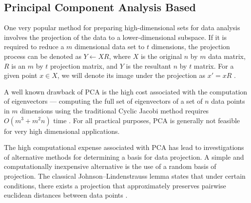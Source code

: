 \subsection{Principal Component Analysis Based}
\label{anomalyDetection:pca}
One very popular method for preparing high-dimensional sets for data analysis
involves the projection of the data to a lower-dimensional subspace. If it is
required to reduce a $m$ dimensional data set to $t$ dimensions, the projection
process can be denoted as $Y \leftarrow XR$, where $X$ is the original $n$ by
$m$ data matrix, $R$ is an $m$ by $t$ projection matrix, and $Y$ is the
resultant $n$ by $t$ matrix. For a given point $x \in X$, we will denote its
image under the projection as $x' = xR$ \cite{Vries:2010}.

A well known drawback of \gls{PCA} is the high cost associated with the
computation of eigenvectors --- computing the full set of eigenvectors of a set
of $n$ data points in $m$ dimensions using the traditional Cyclic Jacobi method
requires $O(m^3+m^2n)$ time \cite{Vries:2010}. For all practical purposes,
\gls{PCA} is generally not feasible for very high dimensional applications.

The high computational expense associated with \gls{PCA} has lead to
investigations of alternative methods for determining a basis for data
projection. A simple and computationally inexpensive alternative is the use of a
random basis of projection. The classical Johnson–Lindenstrauss lemma states
that under certain conditions, there exists a projection that approximately
preserves pairwise euclidean distances between data points \cite{Vries:2010}.